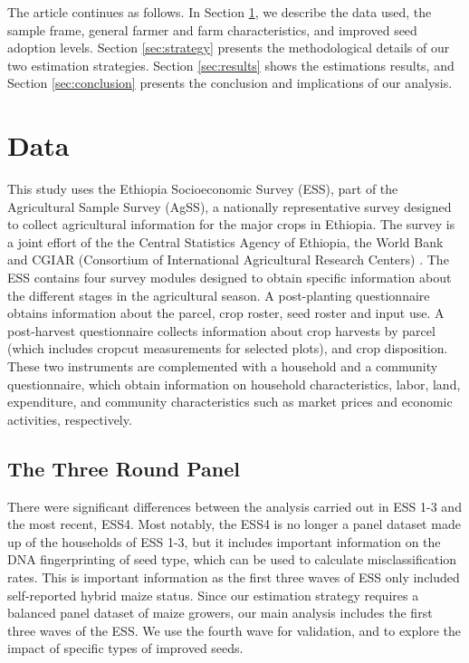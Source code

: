 \documentclass[11pt]{article}
\begin{document}
The article continues as follows. In Section \ref{sec:data}, we describe the data used, the sample frame, general farmer and farm characteristics, and improved seed adoption levels. Section \ref{sec:strategy} presents the methodological details of our two estimation strategies. Section \ref{sec:results} shows the estimations results, and Section \ref{sec:conclusion} presents the conclusion and implications of our analysis.


\section{Data}\label{sec:data}

This study uses the Ethiopia Socioeconomic Survey (ESS), part of the Agricultural Sample Survey (AgSS), a nationally representative survey designed to collect agricultural information for the major crops in Ethiopia. The survey is a joint effort of the the Central Statistics Agency of Ethiopia, the World Bank and CGIAR (Consortium of International Agricultural Research Centers) \citep{kosmowski2020shining}. The ESS contains four survey modules designed to obtain specific information about the different stages in the agricultural season. A post-planting questionnaire obtains information about the parcel, crop roster, seed roster and input use. A post-harvest questionnaire collects information about crop harvests by parcel (which includes cropcut measurements for selected plots), and crop disposition. These two instruments are complemented with a household and a community questionnaire, which obtain information on household characteristics, labor, land, expenditure, and community characteristics such as market prices and economic activities, respectively.

\subsection{The Three Round Panel}

There were significant differences between the analysis carried out in ESS 1-3 and the most recent, ESS4. Most notably, the ESS4 is no longer a panel dataset made up of the households of ESS 1-3, but it includes important information on the DNA fingerprinting of seed type, which can be used to calculate misclassification rates. This is important information as the first three waves of ESS only included self-reported hybrid maize status. Since our estimation strategy requires a balanced panel dataset of maize growers, our main analysis includes the first three waves of the ESS. We use the fourth wave for validation, and to explore the impact of specific types of improved seeds.
\end{document}
